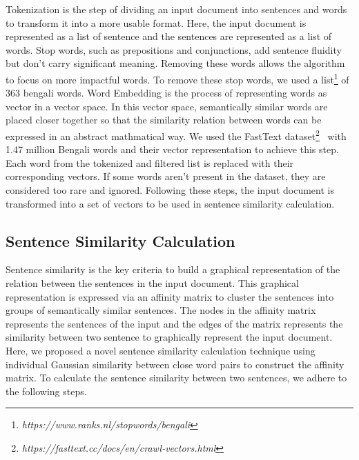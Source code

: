 Tokenization is the step of dividing an input document into sentences and words to transform it into a more usable format. Here, the input document is represented as a list of sentence and the sentences are represented as a list of words. Stop words, such as prepositions and conjunctions, add sentence fluidity but don’t carry significant meaning. Removing these words allows the algorithm to focus on more impactful words. To remove these stop words, we used a list\footnote{\textit{https://www.ranks.nl/stopwords/bengali}} of 363 bengali words. Word Embedding is the process of representing  words as vector in a vector space. In this vector space, semantically similar words are placed closer together so that the similarity relation between words can be expressed in an abstract mathmatical way. We used the FastText dataset\footnote{\textit{https://fasttext.cc/docs/en/crawl-vectors.html}}~\cite{grave-etal-2018-fasttext} with 1.47 million Bengali words and their vector representation to achieve this step. Each word from the tokenized and filtered list is replaced with their corresponding vectors. If some words aren't present in the dataset, they are considered too rare and ignored. Following these steps, the input document is transformed into a set of vectors to be used in sentence similarity calculation. 

\subsection{Sentence Similarity Calculation}\label{subsec:sentence-similarity-calculation}
Sentence similarity is the key criteria to build a graphical representation of the relation between the sentences in the input document. This graphical representation is expressed via an affinity matrix to cluster the sentences into groups of semantically similar sentences. The nodes in the affinity matrix represents the sentences of the input and the edges of the matrix represents the similarity between two sentence to graphically represent the input document. Here, we proposed a novel sentence similarity calculation technique using individual Gaussian similarity between close word pairs to construct the affinity matrix. To calculate the sentence similarity between two sentences, we adhere to the following steps.\\

